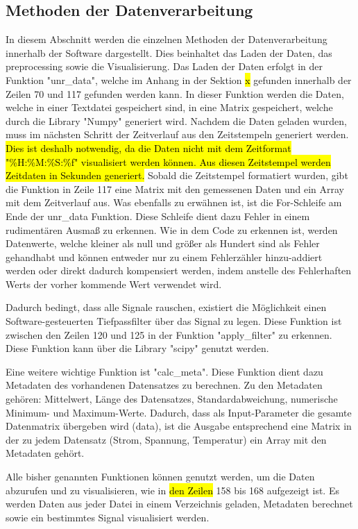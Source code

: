 \subsection{Methoden der Datenverarbeitung}
In diesem Abschnitt werden die einzelnen Methoden der Datenverarbeitung innerhalb der Software dargestellt. Dies beinhaltet das Laden der Daten, das preprocessing sowie die Visualisierung. Das Laden der Daten erfolgt in der Funktion "unr\_data", welche im Anhang in der Sektion \hl{x} gefunden innerhalb der Zeilen 70 und 117 gefunden werden kann. In dieser Funktion werden die Daten, welche in einer Textdatei gespeichert sind, in eine Matrix gespeichert, welche durch die Library "Numpy" generiert wird. Nachdem die Daten geladen wurden, muss im nächsten Schritt der Zeitverlauf aus den Zeitstempeln generiert werden. \hl{Dies ist deshalb notwendig, da die Daten nicht mit dem Zeitformat "\%H:\%M:\%S:\%f" visualisiert werden können. Aus diesen Zeitstempel werden Zeitdaten in Sekunden generiert.} Sobald die Zeitstempel formatiert wurden, gibt die Funktion in Zeile 117 eine Matrix mit den gemessenen Daten und ein Array mit dem Zeitverlauf aus. Was ebenfalls zu erwähnen ist, ist die For-Schleife am Ende der unr\_data Funktion. Diese Schleife dient dazu Fehler in einem rudimentären Ausmaß zu erkennen. Wie in dem Code zu erkennen ist, werden Datenwerte, welche kleiner als null und größer als Hundert sind als Fehler gehandhabt und können entweder nur zu einem Fehlerzähler hinzu-addiert werden oder direkt dadurch kompensiert werden, indem anstelle des Fehlerhaften Werts der vorher kommende Wert verwendet wird.

Dadurch bedingt, dass alle Signale rauschen, existiert die Möglichkeit einen Software-gesteuerten Tiefpassfilter über das Signal zu legen. Diese Funktion ist zwischen den Zeilen 120 und 125 in der Funktion "apply\_filter" zu erkennen. Diese Funktion kann über die Library "scipy" genutzt werden. 

Eine weitere wichtige Funktion ist "calc\_meta". Diese Funktion dient dazu Metadaten des vorhandenen Datensatzes zu berechnen. Zu den Metadaten gehören: Mittelwert, Länge des Datensatzes, Standardabweichung, numerische Minimum- und Maximum-Werte. Dadurch, dass als Input-Parameter die gesamte Datenmatrix übergeben wird (data), ist die Ausgabe entsprechend eine Matrix in der zu jedem Datensatz (Strom, Spannung, Temperatur) ein Array mit den Metadaten gehört.

Alle bisher genannten Funktionen können genutzt werden, um die Daten abzurufen und zu visualisieren, wie in \hl{den Zeilen} 158 bis 168 aufgezeigt ist. Es werden Daten aus jeder Datei in einem Verzeichnis geladen, Metadaten berechnet sowie ein bestimmtes Signal visualisiert werden.



